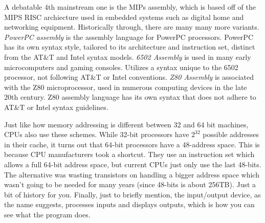 A debatable 4th mainstream one is the MIPs assembly, which is based off of the MIPS RISC archiecture used in embedded systems such as digital home and networking equipment. Historically through, there are many many more variants. \textit{PowerPC assembly} is the assembly language for PowerPC processors. PowerPC has its own syntax style, tailored to its architecture and instruction set, distinct from the AT\&T and Intel syntax models. \textit{6502 Assembly} is used in many early microcomputers and gaming consoles. Utilizes a syntax unique to the 6502 processor, not following AT\&T or Intel conventions. \textit{Z80 Assembly} is associated with the Z80 microprocessor, used in numerous computing devices in the late 20th century. Z80 assembly language has its own syntax that does not adhere to AT\&T or Intel syntax guidelines.


Just like how memory addressing is different between 32 and 64 bit machines, CPUs also use these schemes. While 32-bit processors have $2^{32}$ possible addresses in their cache, it turns out that 64-bit processors have a 48-address space. This is because CPU manufacturers took a shortcut. They use an instruction set which allows a full 64-bit address space, but current CPUs just only use the last 48-bits. The alternative was wasting transistors on handling a bigger address space which wasn't going to be needed for many years (since 48-bits is about 256TB). Just a bit of history for you. Finally, just to briefly mention, the input/output device, as the name suggests, processes inputs and displays outputs, which is how you can see what the program does. 

